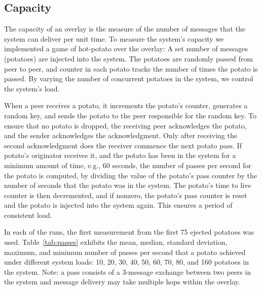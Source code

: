 \documentclass[11pt]{article}
\begin{document}
\subsection{Capacity}
The capacity of an overlay is the measure of the number of messages
that the system can deliver per unit time.  To measure the system's
capacity we implemented a game of hot-potato over the overlay: A
set number of messages (potatoes) are injected into the system.
The potatoes are randomly passed from peer to peer, and counter in
each potato tracks the number of times the potato is passed.  By
varying the number of concurrent potatoes in the system, we control
the system's load.

When a peer receives a potato, it increments the potato's counter,
generates a random key, and sends the potato to the peer responsible
for the random key.  To ensure that no potato is dropped, the
receiving peer acknowledges the potato, and the sender acknowledges
the acknowledgment.  Only after receiving the second acknowledgment
does the receiver commence the next potato pass.  If potato's
originator receives it, and the potato has been in the system for
a minimum amount of time, e.g., 60 seconds, the number of passes
per second for the potato is computed, by dividing the value of the
potato's pass counter by the number of seconds that the potato was
in the system.  The potato's time to live counter is then decremented,
and if nonzero, the potato's pass counter is reset and the potato
is injected into the system again.  This ensures a period of
consistent load.

In each of the runs, the first measurement from the first 75 ejected
potatoes was used.  Table~\ref{tab:passes} exhibits the mean, median,
standard deviation, maximum, and minimum number of passes per second
that a potato achieved under different system loads:  10, 20, 30,
40, 50, 60, 70, 80, and 160 potatoes in the system.  Note: a pass
consists of a 3-message exchange between two peers in the system
and message delivery may take multiple hops within the overlay.
\end{document}
